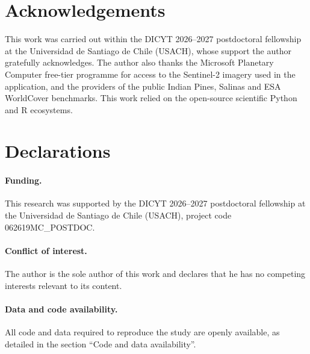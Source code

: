 \section*{Acknowledgements}

This work was carried out within the DICYT 2026--2027 postdoctoral fellowship
at the Universidad de Santiago de Chile (USACH), whose support the author
gratefully acknowledges. The author also thanks the Microsoft Planetary
Computer free-tier programme for access to the Sentinel-2 imagery used in the
application, and the providers of the public Indian Pines, Salinas and ESA
WorldCover benchmarks. This work relied on the open-source scientific Python
and R ecosystems.

\section*{Declarations}

\paragraph{Funding.}
This research was supported by the DICYT 2026--2027 postdoctoral fellowship at
the Universidad de Santiago de Chile (USACH), project code 062619MC\_POSTDOC.

\paragraph{Conflict of interest.}
The author is the sole author of this work and declares that he has no
competing interests relevant to its content.

\paragraph{Data and code availability.}
All code and data required to reproduce the study are openly available, as
detailed in the section ``Code and data availability''.
